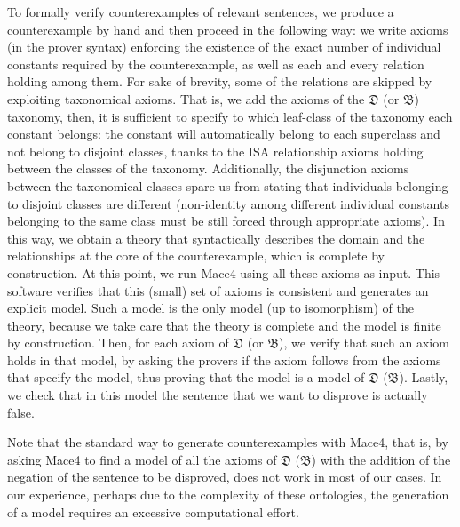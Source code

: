 \documentclass[ao]{iosart2x}
\newcommand{\nb}[1]{\textcolor{red}{$|$}\marginpar{\hspace*{-0cm}\parbox{20mm}{\scriptsize\raggedright\textcolor{red}{#1}}}}
\newcommand {\thdolce} {\ensuremath{\mathfrak{D}}}
\newcommand {\thbfo} {\ensuremath{\mathfrak{B}}}
\begin{document}
To formally verify counterexamples of relevant sentences, we produce a counterexample by hand and then proceed in the following way: we write axioms (in the prover syntax) enforcing the existence of the exact number of individual constants required by the counterexample, as well as each and every relation holding among them. 
For sake of brevity, some of the relations are skipped by exploiting taxonomical axioms. That is, we add the axioms of the {$\thdolce$} (or  {$\thbfo$}) taxonomy, %
then, it is sufficient to specify to which leaf-class of the taxonomy each constant belongs: the constant will automatically belong to each superclass and not belong to disjoint classes, thanks to the ISA relationship axioms holding between the classes of the taxonomy. Additionally, the disjunction axioms between the taxonomical classes spare us from stating that individuals belonging to disjoint classes are different (non-identity among different individual constants belonging to the same class must be still forced through appropriate axioms). %
In this way, we obtain a theory that syntactically describes the domain and the relationships at the core of the counterexample, which is complete by construction. 
At this point, we run Mace4 using all these axioms as input. %
This software verifies that this (small) set of axioms is consistent and generates an explicit model.
Such a model is the only model (up to isomorphism) of the theory, because we take care that the theory is complete and the model is finite by construction.
Then, for each axiom of {$\thdolce$} (or $\thbfo$), we verify that such an axiom holds in that model, by asking the provers if the axiom follows from the axioms that specify the model, thus proving that the model is a model of {$\thdolce$} ($\thbfo$). %
Lastly, we check that in this model the sentence that we want to disprove is actually false. %

Note that the standard way to generate counterexamples with Mace4, that is, by asking Mace4 to find a model of all the axioms of {$\thdolce$} ($\thbfo$) with the addition of the negation of the sentence to be disproved, does not work in most of our cases. In our experience, perhaps due to the complexity of these ontologies, the generation of a model requires an excessive computational effort.
\end{document}
